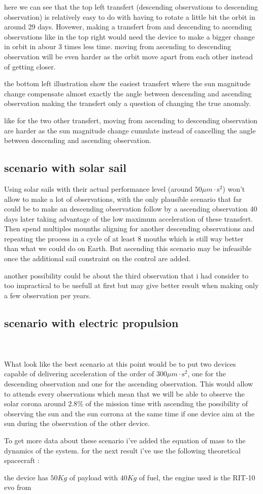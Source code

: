 \documentclass{article} %
\begin{document}
			here we can see that the top left transfert (descending observations to descending observation) is relatively easy to do with having to rotate a little bit the orbit in around 29 days. Hovewer, making a transfert from and descending to ascending observations like in the top right  would need the device to make a bigger change in orbit in abour 3 times less time. moving from ascending to descending observation will be even harder as the orbit move apart from each other instead of getting closer.
			
			the bottom left illustration show the easiest transfert where the sun magnitude change compensate almost exactly the angle between descending and ascending observation making the transfert only a question of changing the true anomaly.
			
			like for the two other transfert, moving from ascending to descending observation are harder as the sun magnitude change cumulate instead of cancelling the angle between descending and ascending observation. 
			
			
			
			\subsection{scenario with solar sail}
			
			Using solar sails with their actual performance level (around $50\mu{m}\cdot\text{s}^2$) won't allow to make a lot of observations, with the only plausible scenario that far could be to make an descending observation follow by a ascending observation 40 days later taking advantage of the low maximum acceleration of these transfert. Then spend multiples mounths aligning for another descending observations and repeating the process in a cycle of at least 8 mouths which is still way better than what we could do on Earth. But ascending this scenario may be infeasible once the additional sail constraint on the control are added.
			
			another possibility could be about the third observation that i had consider to too impractical to be usefull at first but may give better result when making only a few observation per years.
			
			\subsection{scenario with electric propulsion}	
			\\ \\
			What look like the best scenario at this point would be to put two devices capable of delivering acceleration of the order of $300\mu{m}\cdot\text{s}^2$, one for the descending observation and one for the ascending observation. This would allow to attends every observations which mean that we will be able to observe the solar corona around $2.8\%$ of the mission time with ascending the possibility of observing the sun and the sun corrona at the same time if one device aim at the sun during the observation of the other device.
			
			To get more data about these scenario i've added the equation of mass to the dynamics of the system. for the next result i've use the following theoretical spacecraft : 
			
			the device has $50Kg$ of payload with $40Kg$ of fuel, the engine used is the RIT-10 evo from 
			 
	
		
\end{document}
